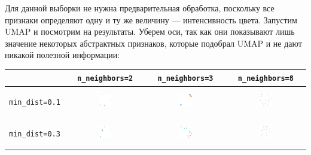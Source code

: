 Для данной выборки не нужна предварительная обработка, поскольку все признаки определяют одну и ту же величину --- интенсивность цвета.
Запустим UMAP и посмотрим на результаты. Уберем оси, так как они показывают лишь значение некоторых абстрактных признаков, которые подобрал UMAP и не дают никакой полезной информации:
\begin{center}
\begin{tabular}{c|c|c|c}
\arrayrulecolor[rgb]{0.8,0.85,1}
	& \verb|n_neighbors=2| & \verb|n_neighbors=3| & \verb|n_neighbors=8| \\
	\hline
	\begin{sideways} \verb|min_dist=0.1| \end{sideways} & \includegraphics*[width = 0.18\textwidth]{0,1colors2.png} & \includegraphics*[width = 0.18\textwidth]{0,1colors3.png} & \includegraphics*[width = 0.18\textwidth]{0,1colors8.png} \\
	\hline
	\begin{sideways} \verb|min_dist=0.3| \end{sideways} & \includegraphics*[width = 0.18\textwidth]{0,3colors2.png} & \includegraphics*[width = 0.18\textwidth]{0,3colors3.png} & \includegraphics*[width = 0.18\textwidth]{0,3colors8.png} \\

\end{tabular}
\end{center}
